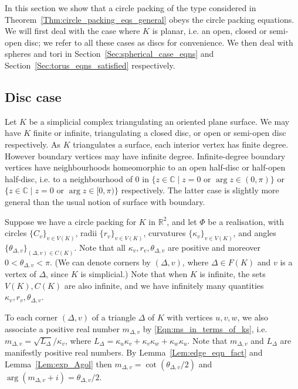 \documentclass[12pt]{amsart}
\numberwithin{equation}{section}
\theoremstyle{named}
\newcommand{\refsec}[1]{Section~\ref{Sec:#1}}
\newcommand{\refeqn}[1]{\eqref{Eqn:#1}}
\newcommand{\reflem}[1]{Lemma~\ref{Lem:#1}}
\newcommand{\refthm}[1]{Theorem~\ref{Thm:#1}}
\newcommand{\R}{\mathbb{R}}
\newcommand{\C}{\mathbb{C}}
\begin{document}
In this section we show that a circle packing of the type considered in \refthm{circle_packing_eqs_general} obeys the circle packing equations. We will first deal with the case where $K$ is planar, i.e. an open, closed or semi-open disc; we refer to all these cases as discs for convenience. We then deal with spheres and tori in \refsec{spherical_case_eqns} and \refsec{torus_eqns_satisfied} respectively.

\subsection{ Disc case}
\label{Sec:disc_case}

Let $K$ be a simplicial complex triangulating an oriented plane surface. We may have $K$ finite or infinite, triangulating a closed disc, or open or semi-open disc respectively. 
As $K$ triangulates a surface, each interior vertex has finite degree. However boundary vertices may have infinite degree. Infinite-degree boundary vertices have neighbourhoods homeomorphic to an open half-disc or half-open half-disc, i.e. to a neighbourhood of $0$ in $\{z \in \C \mid z = 0 \text{ or } \arg z \in (0, \pi) \}$ or $\{z \in \C \mid z = 0 \text{ or } \arg z \in [0, \pi) \}$ respectively. The latter case is slightly more general than the usual notion of surface with boundary.

Suppose we have a circle packing for $K$ in $\R^2$, and let $\Phi$ be a realisation, with circles $\{C_v\}_{v \in V(K)}$, radii $\{r_v\}_{v \in V(K)}$, curvatures $\{\kappa_v\}_{v \in V(K)}$, and angles $\{\theta_{\Delta,v}\}_{(\Delta,v) \in C(K)}$. Note that all $\kappa_v, r_v, \theta_{\Delta,v}$ are positive and moreover $0 < \theta_{\Delta,v} < \pi$. (We can denote corners by $(\Delta,v)$, where $\Delta \in F(K)$ and $v$ is a vertex of $\Delta$, since $K$ is simplicial.) Note that when $K$ is infinite, the sets $V(K), C(K)$ are also infinite, and we have infinitely many quantities $\kappa_v, r_v, \theta_{\Delta,v}$.

To each corner $(\Delta, v)$ of a triangle $\Delta$ of $K$ with vertices $u,v,w$, we also associate a positive real number $m_{\Delta,v}$ by \refeqn{ms_in_terms_of_ks}, i.e. $m_{\Delta,v} = \sqrt{L_\Delta}/\kappa_v$, where $L_\Delta = \kappa_u \kappa_v + \kappa_v \kappa_w + \kappa_w \kappa_u$. Note that $m_{\Delta,v}$ and $L_\Delta$ are manifestly positive real numbers. By \reflem{edge_eqn_fact} and \reflem{exp_Agol} then $m_{\Delta,v} = \cot ( \theta_{\Delta,v} / 2)$ and $\arg (m_{\Delta,v} + i) = \theta_{\Delta,v}/2$. 
\end{document}

